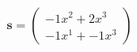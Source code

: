 \documentclass[preview]{standalone}
\begin{document}
\begin{align*}
\mathbf{s} = \begin{pmatrix}-1x^{2} + 2x^{3} \\ -1x^{1} + -1x^{3}\end{pmatrix}
\end{align*}
\end{document}
